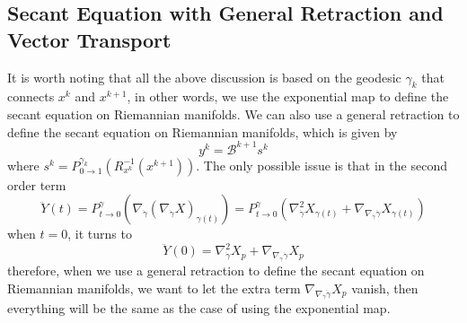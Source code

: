 \documentclass[12pt,a4paper,draft]{article}  %
\theoremstyle{definition}
\numberwithin{equation}{section}
\begin{document}
\subsection{Secant Equation with General Retraction and Vector Transport}
It is worth noting that all the above discussion is based on the geodesic $\gamma_k$ that connects $x^k$ and $x^{k+1}$, in other words, we use the exponential map to define the secant equation on Riemannian manifolds. We can also use a general retraction to define the secant equation on Riemannian manifolds, which is given by
\begin{equation}
        y^k = \mathcal{B}^{k+1} s^k
\end{equation}
where $s^k = P_{0\to1}^{\gamma_k} (R_{x^k}^{-1}(x^{k+1}))$. The only possible issue is that in the second order term
\[
\ddot{Y}(t) = P_{t\to0}^\gamma \left(\nabla_{\dot{\gamma}} \left(\nabla_{\dot{\gamma}} X\right)_{\gamma(t)}\right) = P_{t\to0}^\gamma\left(\nabla^2_{\dot{\gamma}} X_{\gamma(t)} + \nabla_{\nabla_{\dot{\gamma}} \dot{\gamma}} X_{\gamma(t)}\right)
\]
when $t = 0$, it turns to
\[
\ddot{Y}(0) = \nabla^2_{\dot{\gamma}} X_p + \nabla_{\nabla_{\dot{\gamma}} \dot{\gamma}} X_p
\]
therefore, when we use a general retraction to define the secant equation on Riemannian manifolds, we want to let the extra term $\nabla_{\nabla_{\dot{\gamma}} \dot{\gamma}} X_p$ vanish, then everything will be the same as the case of using the exponential map. 
\end{document}
